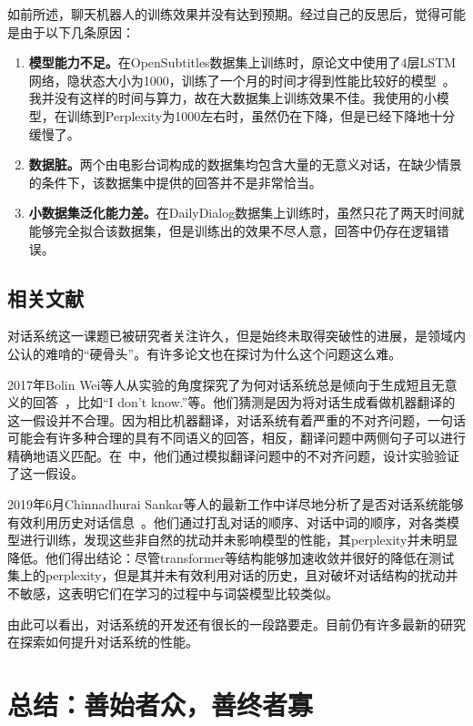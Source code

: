 \documentclass[12pt]{article} %
\begin{document}
\begin{sloppypar}
如前所述，聊天机器人的训练效果并没有达到预期。经过自己的反思后，觉得可能是由于以下几条原因：
\begin{enumerate}
	\item {\bf 模型能力不足。}在OpenSubtitles数据集上训练时，原论文中使用了4层LSTM网络，隐状态大小为1000，训练了一个月的时间才得到性能比较好的模型~\cite{li2016persona}。我并没有这样的时间与算力，故在大数据集上训练效果不佳。我使用的小模型，在训练到Perplexity为1000左右时，虽然仍在下降，但是已经下降地十分缓慢了。
	\item {\bf 数据脏。}两个由电影台词构成的数据集均包含大量的无意义对话，在缺少情景的条件下，该数据集中提供的回答并不是非常恰当。
	\item {\bf 小数据集泛化能力差。}在DailyDialog数据集上训练时，虽然只花了两天时间就能够完全拟合该数据集，但是训练出的效果不尽人意，回答中仍存在逻辑错误。
\end{enumerate}

\subsection{相关文献}

对话系统这一课题已被研究者关注许久，但是始终未取得突破性的进展，是领域内公认的难啃的“硬骨头”。有许多论文也在探讨为什么这个问题这么难。

2017年Bolin Wei等人从实验的角度探究了为何对话系统总是倾向于生成短且无意义的回答~\cite{wei2019neural}，比如“I don't know.”等。他们猜测是因为将对话生成看做机器翻译的这一假设并不合理。因为相比机器翻译，对话系统有着严重的不对齐问题，一句话可能会有许多种合理的具有不同语义的回答，相反，翻译问题中两侧句子可以进行精确地语义匹配。在~\cite{wei2019neural}中，他们通过模拟翻译问题中的不对齐问题，设计实验验证了这一假设。

2019年6月Chinnadhurai Sankar等人的最新工作中详尽地分析了是否对话系统能够有效利用历史对话信息~\cite{sankar2019neural}。他们通过打乱对话的顺序、对话中词的顺序，对各类模型进行训练，发现这些非自然的扰动并未影响模型的性能，其perplexity并未明显降低。他们得出结论：尽管transformer等结构能够加速收敛并很好的降低在测试集上的perplexity，但是其并未有效利用对话的历史，且对破坏对话结构的扰动并不敏感，这表明它们在学习的过程中与词袋模型比较类似。

由此可以看出，对话系统的开发还有很长的一段路要走。目前仍有许多最新的研究在探索如何提升对话系统的性能。

\newpage
\section{总结：善始者众，善终者寡}


\end{sloppypar}
\end{document}
